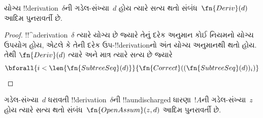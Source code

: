 \documentclass[../../../include/open-logic-section]{subfiles}
\begin{document}
\begin{prop}
  યોગ્ય !!{derivation}~$\delta$ની
  ગડેલ-સંખ્યા~$d$ હોય ત્યારે સત્ય
  થતો સંબંધ~$\fn{Deriv}(d)$ આદિમ
  પુનરાવર્તી છે.
\end{prop}

\begin{proof}
  !!^a{derivation}~$\delta$ ત્યારે યોગ્ય
  છે જ્યારે તેનું દરેક અનુમાન કોઈ
  નિયમનો યોગ્ય ઉપયોગ હોય, એટલે કે
  તેની દરેક ઉપ-!!{derivation}નો અંત
  યોગ્ય અનુમાનથી થતો હોય. તેથી
  $\fn{Deriv}(d)$ ત્યારે અને માત્ર
  ત્યારે સત્ય છે જ્યારે
  \[
  \bforall{i<\len{\fn{SubtreeSeq}(d)}}{\fn{Correct}((\fn{SubtreeSeq}(d))_i)}
  \]
\end{proof}

\begin{prop}
  ગડેલ-સંખ્યા~$d$ ધરાવતી
  !!{derivation}~$\delta$ની
  !!a{undischarged} ધારણા~$!A$ની
  ગડેલ-સંખ્યા~$z$ હોય ત્યારે સત્ય
  થતો સંબંધ~$\fn{OpenAssum}(z, d)$
  આદિમ પુનરાવર્તી છે.
\end{prop}
\end{document}
